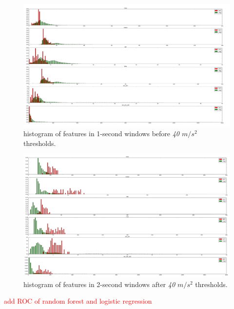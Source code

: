 \documentclass{soups}
\begin{document}
\begin{figure}[H]
\begin{center}
\includegraphics[width=1.0\columnwidth]{hist_features_before_win_size_1_2.png}
\end{center}
\caption{histogram of features in 1-second windows before \textit{40 $m/s^2$} thresholds.}
\end{figure}

\begin{figure}[H]
\begin{center}
\includegraphics[width=1.0\columnwidth]{hist_features_after_win_size_1_2.png}
\end{center}
\caption{histogram of features in 2-second windows after \textit{40 $m/s^2$} thresholds.}
\end{figure}



\textcolor{red}{add ROC of random forest and logistic regression }
\end{document}
